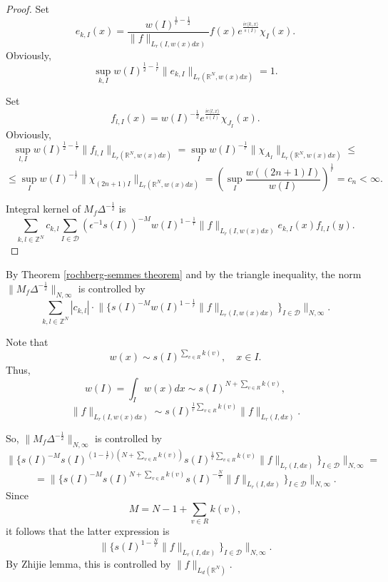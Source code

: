 \documentclass{amsart}
\begin{document}
\begin{proof}
Set
$$e_{k,I}(x)=\frac{w(I)^{\frac1r-\frac12}}{\|f\|_{L_r(I,w(x)dx)}}f(x)e^{\frac{i\epsilon\langle k,x\rangle}{s(I)}}\chi_I(x).$$
Obviously,
$$\sup_{k,I}w(I)^{\frac12-\frac1r}\|e_{k,I}\|_{L_r(\mathbb{R}^N,w(x)dx)}=1.$$

Set
$$f_{l,I}(x)=w(I)^{-\frac12}e^{\frac{i\epsilon\langle l,x\rangle}{s(I)}}\chi_{J_I}(x).$$
Obviously,
$$\sup_{l,I}w(I)^{\frac12-\frac1r}\|f_{l,I}\|_{L_r(\mathbb{R}^N,w(x)dx)}=\sup_Iw(I)^{-\frac1r}\|\chi_{A_I}\|_{L_r(\mathbb{R}^N,w(x)dx)}\leq$$
$$\leq \sup_Iw(I)^{-\frac1r}\|\chi_{(2n+1)I}\|_{L_r(\mathbb{R}^N,w(x)dx)}=(\sup_I\frac{w((2n+1)I)}{w(I)})^{\frac1r}=c_n<\infty.$$

Integral kernel of $M_f\Delta^{-\frac12}$ is
$$\sum_{k,l\in\mathbb{Z}^N}c_{k,l}\sum_{I\in\mathcal{D}}(\epsilon^{-1}s(I))^{-M}w(I)^{1-\frac1r}\|f\|_{L_r(I,w(x)dx)}e_{k,I}(x)f_{l,I}(y).$$
\end{proof}

By Theorem \ref{rochberg-semmes theorem} and by the triangle inequality, the norm $\|M_f\Delta^{-\frac12}\|_{N,\infty}$ is controlled by
$$\sum_{k,l\in\mathbb{Z}^N}|c_{k,l}|\cdot \Big\|\Big\{s(I)^{-M}w(I)^{1-\frac1r}\|f\|_{L_r(I,w(x)dx)}\Big\}_{I\in\mathcal{D}}\Big\|_{N,\infty}.$$

Note that
$$w(x)\sim s(I)^{\sum_{v\in R}k(v)},\quad x\in I.$$
Thus,
$$w(I)=\int_Iw(x)dx\sim s(I)^{N+\sum_{v\in R}k(v)},$$
$$\|f\|_{L_r(I,w(x)dx)}\sim s(I)^{\frac1r\sum_{v\in R}k(v)}\|f\|_{L_r(I,dx)}.$$

So, $\|M_f\Delta^{-\frac12}\|_{N,\infty}$ is controlled by
$$\Big\|\Big\{s(I)^{-M}s(I)^{(1-\frac1r)(N+\sum_{v\in R}k(v))}s(I)^{\frac1r\sum_{v\in R}k(v)}\|f\|_{L_r(I,dx)}\Big\}_{I\in\mathcal{D}}\Big\|_{N,\infty}=$$
$$=\Big\|\Big\{s(I)^{-M}s(I)^{N+\sum_{v\in R}k(v)}s(I)^{-\frac{N}{r}}\|f\|_{L_r(I,dx)}\Big\}_{I\in\mathcal{D}}\Big\|_{N,\infty}.$$
Since
$$M=N-1+\sum_{v\in R}k(v),$$
it follows that the latter expression is
$$\Big\|\Big\{s(I)^{1-\frac{N}{r}}\|f\|_{L_r(I,dx)}\Big\}_{I\in\mathcal{D}}\Big\|_{N,\infty}.$$
By Zhijie lemma, this is controlled by $\|f\|_{L_d(\mathbb{R}^N)}.$
\end{document}
